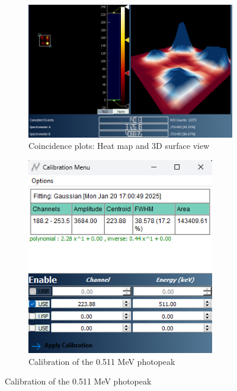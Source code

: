 \begin{figure}[H]
    \begin{subfigure}{\linewidth}
        \centering
        \includegraphics[width=1\textwidth]{images/180/3d.png}
        \caption{Coincidence plots: Heat map and 3D surface view}
    \end{subfigure}
    
    \bigskip
    \begin{subfigure}{\linewidth}
        \centering
        \includegraphics[width=0.9\textwidth]{images/180/calibration.png}
        \caption{Calibration of the 0.511 MeV photopeak}
    \end{subfigure}
    

\end{figure}
